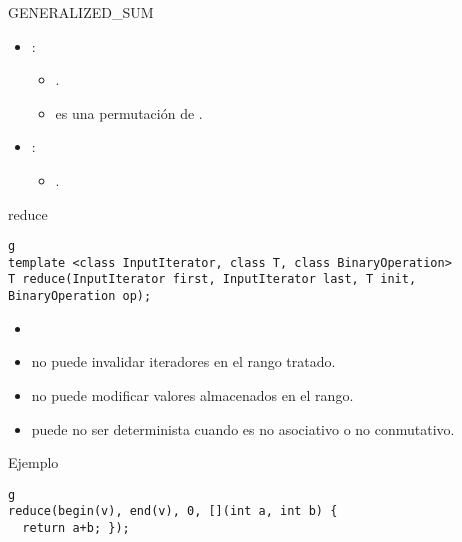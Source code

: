 \begin{frame}[t]{GENERALIZED\_SUM}
\begin{itemize}
  \item {}:
    \begin{itemize}
      \item {}.
      \item {} es una permutación de .
    \end{itemize}
  \vfill
  \item {}:
    \begin{itemize}
      \item {}.
    \end{itemize}
\end{itemize}
\end{frame}

\begin{frame}[t,fragile]{reduce}
\begin{lstlisting}g
template <class InputIterator, class T, class BinaryOperation>
T reduce(InputIterator first, InputIterator last, T init, BinaryOperation op);
\end{lstlisting}
\begin{itemize}
  \item {}
  \item {} no puede invalidar iteradores en el rango tratado.
  \item {} no puede modificar valores almacenados en el rango.
  \item {} puede no ser determinista cuando  es no asociativo o no conmutativo.
\end{itemize}
\begin{block}{Ejemplo}
\begin{lstlisting}g
reduce(begin(v), end(v), 0, [](int a, int b) { 
  return a+b; });
\end{lstlisting}
\end{block}
\end{frame}

